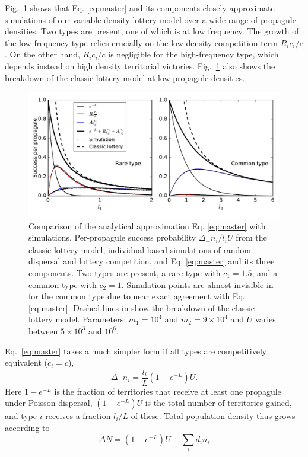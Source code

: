 \documentclass[12pt]{article}
\begin{document}
Fig.~\ref{fig:simcomp} shows that Eq. \eqref{eq:master} and its components closely approximate simulations of our variable-density lottery model over a wide range of propagule densities. Two types are present, one of which is at low frequency. The growth of the low-frequency type relies crucially on the low-density competition term $R_i c_i/\overline{c}$. On the other hand, $R_i c_i/\overline{c}$ is negligible for the high-frequency type, which depends instead on high density territorial victories. Fig.~\ref{fig:simcomp} also shows the breakdown of the classic lottery model at low propagule densities.

\begin{figure}
\centering
\includegraphics[scale=0.8]{simulationcomparison.pdf}
\caption{\label{fig:simcomp} Comparison of the analytical approximation Eq. \eqref{eq:master} with simulations. Per-propagule success probability $\Delta_+ n_i/l_i U$ from the classic lottery model, individual-based simulations of random dispersal and lottery competition, and Eq. \eqref{eq:master} and its three components. Two types are present, a rare type with $c_1=1.5$, and a common type with $c_2=1$. Simulation points are almost invisible in for the common type due to near exact agreement with Eq. \eqref{eq:master}. Dashed lines in show the breakdown of the classic lottery model. Parameters: $m_1=10^4$ and $m_2=9\times 10^4$ and $U$ varies between $5\times 10^3$ and $10^6$.} 
\end{figure}

Eq.~\eqref{eq:master} takes a much simpler form if all types are competitively equivalent ($c_i=c$),
\begin{equation}
\Delta_+ n_i = \frac{l_i}{L}(1-e^{-L})U. \label{eq:masterequalc}
\end{equation}
Here $1-e^{-L}$ is the fraction of territories that receive at least one propagule under Poisson dispersal, $(1-e^{-L})U$ is the total number of territories gained, and type $i$ receives a fraction $l_i/L$ of these. Total population density thus grows according to
\begin{equation}
\Delta N=(1-e^{-L})U-\sum_i d_i n_i \label{eq:Nmaster}
\end{equation}
\end{document}
